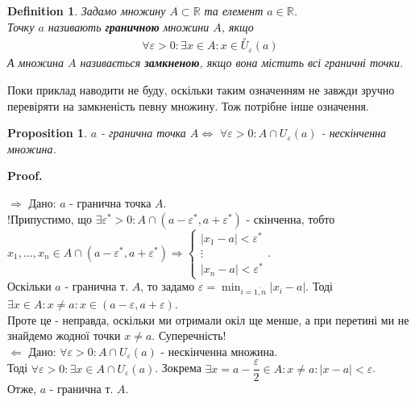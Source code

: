 \documentclass[a4paper, 14pt]{article}
\makeatletter
\def\huge{\displaystyle}
\def\qed{$\blacksquare$}
\def\rightproof{$\boxed{\Rightarrow}$ }
\def\leftproof{$\boxed{\Leftarrow}$ }
\theoremstyle{theoremdd}
\theoremstyle{theoremdd}
\newtheorem{definition}[theorem]{Definition}
\theoremstyle{theoremdd}
\theoremstyle{theoremdd}
\theoremstyle{theoremdd}
\newtheorem{proposition}[theorem]{Proposition}
\theoremstyle{theoremdd}
\theoremstyle{theoremdd}
\theoremstyle{theoremdd}
\renewenvironment{proof}[1][Proof.\\]{\par
\pushQED{\hfill \qed}%
\normalfont \topsep6\p@\@plus6\p@\relax
\trivlist
\item\relax
{\bfseries
#1\@addpunct{.}}\hspace\labelsep\ignorespaces
}{%
\popQED\endtrivlist\@endpefalse
}
\makeatother
\begin{document}
\begin{definition}
Задамо множину $A \subset \mathbb{R}$ та елемент $a \in \mathbb{R}$.\\
Точку $a$ називають \textbf{граничною} множини $A$, якщо
\begin{align*}
\forall \varepsilon > 0: \exists x \in A: x \in \overset{\circ}{U}_{\varepsilon}(a)
\end{align*}
А множина $A$ називається \textbf{замкненою}, якщо вона містить всі граничні точки.
\end{definition}
Поки приклад наводити не буду, оскільки таким означенням не завжди зручно перевіряти на замкненість певну множину. Тож потрібне інше означення.
\begin{proposition}
$a$ - гранична точка $A \iff$ $\forall \varepsilon > 0: A \cap U_{\varepsilon}(a)$ - нескінченна множина.
\end{proposition}

\begin{proof}
\rightproof Дано: $a$ - гранична точка $A$.\\
!Припустимо, що $\exists \varepsilon^* > 0: A \cap (a-\varepsilon^*,a+\varepsilon^*)$ - скінченна, тобто\\
$x_1,\dots,x_n \in A \cap (a-\varepsilon^*,a+\varepsilon^*) \Rightarrow \begin{cases} |x_1-a| < \varepsilon^* \\ \vdots \\ |x_n-a| < \varepsilon^* \end{cases}$.\\
Оскільки $a$ - гранична т. $A$, то задамо $\varepsilon = \huge\min_{i = \overline{1,n}} |x_i-a|$. Тоді $\exists x \in A: x \neq a: x \in (a-\varepsilon,a+\varepsilon)$.\\
Проте це - неправда, оскільки ми отримали окіл ще менше, а при перетині ми не знайдемо жодної точки $x \neq a$. Суперечність!
\bigskip \\

\leftproof Дано: $\forall \varepsilon > 0: A \cap U_{\varepsilon}(a)$ - нескінченна множина.\\
Тоді $\forall \varepsilon > 0: \exists x \in A \cap U_{\varepsilon}(a)$. Зокрема $\exists x = a - \dfrac{\varepsilon}{2} \in A: x \neq a: |x-a| < \varepsilon$.\\
Отже, $a$ - гранична т. $A$.
\end{proof}
\end{document}
